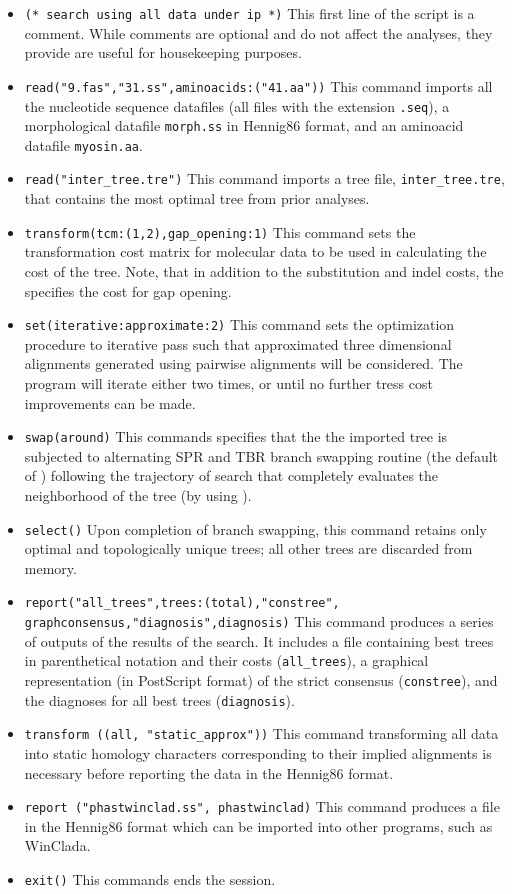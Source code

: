 \begin{itemize}
\item \texttt{(* search using all data under ip *)} This first line of the script is a comment. While comments are optional and do not affect the analyses, they provide are useful for housekeeping purposes.
\item \texttt{read("9.fas","31.ss",aminoacids:("41.aa"))} This command imports all the nucleotide sequence datafiles (all files with the extension \texttt{.seq}), a morphological datafile \texttt{morph.ss} in Hennig86 format, and an aminoacid datafile \texttt{myosin.aa}.
\item \texttt{read("inter\_tree.tre")} This command imports a tree file, \texttt{inter\_tree.tre}, that contains the most optimal tree from prior analyses. 
\item \texttt{transform(tcm:(1,2),gap\_opening:1)} This command sets the transformation cost matrix for molecular data to be used in calculating the cost of the tree. Note, that in addition to the substitution and indel costs, the  specifies the cost for gap opening.
\item \texttt{set(iterative:approximate:2)} This command sets the optimization procedure
    to iterative pass such that approximated three dimensional alignments generated using pairwise alignments will be considered.  The program will iterate either two times, or until no further tress cost improvements can be made.
\item \texttt{swap(around)} This commands specifies that the the imported tree is subjected to alternating SPR and TBR branch swapping routine (the default of \poy) following the trajectory of search that completely evaluates the neighborhood of the tree (by using ).
\item \texttt{select()} Upon completion of branch swapping, this command retains only optimal and topologically unique trees; all other trees are discarded from memory.
\item \texttt{report("all\_trees",trees:(total),"constree",\\graphconsensus,"diagnosis",diagnosis)} This command produces a series of outputs of the results of the search. It includes a file containing best trees in parenthetical notation and their costs (\texttt{all\_trees}), a graphical representation (in PostScript format) of the strict consensus (\texttt{constree}), and the diagnoses for all best trees (\texttt{diagnosis}).
\item \texttt{transform ((all, "static\_approx"))} This command transforming all data into static homology characters corresponding to their implied alignments is necessary before reporting the data in the Hennig86 format.
\item \texttt{report ("phastwinclad.ss", phastwinclad)}  This command produces a file in the Hennig86 format which can be imported into other programs, such as WinClada.
\item \texttt{exit()} This commands ends the \poy session.
\end{itemize}

